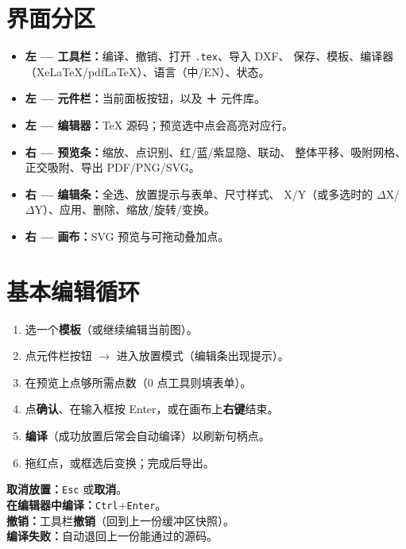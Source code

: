 \documentclass[a4paper]{ltxdoc}
\newcommand{\ui}[1]{\textbf{#1}}
\newcommand{\key}[1]{\texttt{#1}}
\begin{document}
\section{界面分区}

\begin{itemize}[nosep]
  \item \textbf{左 --- 工具栏：}编译、撤销、打开 \texttt{.tex}、导入 DXF、
        保存、模板、编译器（XeLaTeX/pdfLaTeX）、语言（中/EN）、状态。
  \item \textbf{左 --- 元件栏：}当前面板按钮，以及 \ui{＋} 元件库。
  \item \textbf{左 --- 编辑器：}TeX 源码；预览选中点会高亮对应行。
  \item \textbf{右 --- 预览条：}缩放、点识别、红/蓝/紫显隐、联动、
        整体平移、吸附网格、正交吸附、导出 PDF/PNG/SVG。
  \item \textbf{右 --- 编辑条：}全选、放置提示与表单、尺寸样式、
        X/Y（或多选时的 $\Delta$X/$\Delta$Y）、应用、删除、缩放/旋转/变换。
  \item \textbf{右 --- 画布：}SVG 预览与可拖动叠加点。
\end{itemize}

\section{基本编辑循环}

\begin{enumerate}[nosep]
  \item 选一个\ui{模板}（或继续编辑当前图）。
  \item 点元件栏按钮 $\rightarrow$ 进入放置模式（编辑条出现提示）。
  \item 在预览上点够所需点数（$0$ 点工具则填表单）。
  \item 点\ui{确认}、在输入框按 Enter，或在画布上\textbf{右键}结束。
  \item \ui{编译}（成功放置后常会自动编译）以刷新句柄点。
  \item 拖红点，或框选后变换；完成后导出。
\end{enumerate}

\noindent\textbf{取消放置：}\key{Esc} 或\ui{取消}。\\
\textbf{在编辑器中编译：}\key{Ctrl}+\key{Enter}。\\
\textbf{撤销：}工具栏\ui{撤销}（回到上一份缓冲区快照）。\\
\textbf{编译失败：}自动退回上一份能通过的源码。
\end{document}
